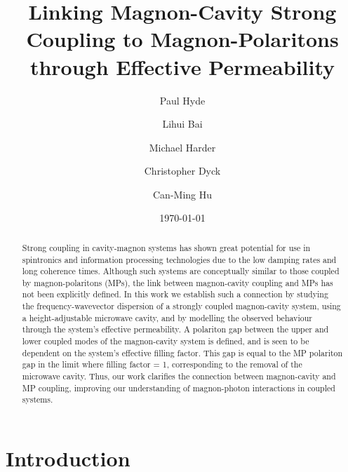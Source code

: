 \documentclass[prb,twocolumn,showpacs,preprintnumbers,amsmath,amssymb]{revtex4-1}
\begin{document}

\title{Linking Magnon-Cavity Strong Coupling to Magnon-Polaritons through Effective Permeability}
\author{Paul Hyde}
\author{Lihui Bai}
\author{Michael Harder}
\author{Christopher Dyck}
\author{Can-Ming Hu}




\date{\today}

\begin{abstract}


Strong coupling in cavity-magnon systems has shown great potential for use in spintronics and information processing technologies due to the low damping rates and long coherence times. Although such systems are conceptually similar to those coupled by magnon-polaritons (MPs), the link between magnon-cavity coupling and MPs has not been explicitly defined. In this work we establish such a connection by studying the frequency-wavevector dispersion of a strongly coupled magnon-cavity system, using a height-adjustable microwave cavity, and by modelling the observed behaviour through the system's effective permeability. A polariton gap between the upper and lower coupled modes of the magnon-cavity system is defined, and is seen to be dependent on the system's effective filling factor. This gap is equal to the MP polariton gap in the limit where filling factor = 1, corresponding to the removal of the microwave cavity. Thus, our work clarifies the connection between magnon-cavity and MP coupling, improving our understanding of magnon-photon interactions in coupled systems.







\end{abstract}

\maketitle

\section{Introduction}
\end{document}
